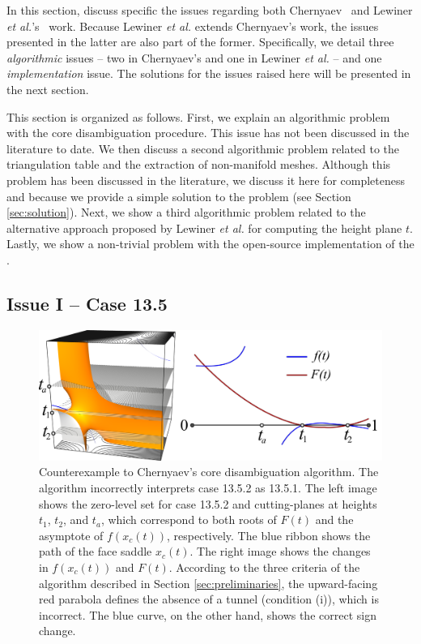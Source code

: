 In this section, discuss specific the issues regarding both Chernyaev~\cite{Chernyaev95marchingcubes} and Lewiner \emph{et al.}'s~\cite{Lewiner:2003} work. Because Lewiner \emph{et al.} extends Chernyaev's work, the issues presented in the latter are also part of the former. Specifically, we detail three \emph{algorithmic} issues -- two in Chernyaev's \mc{} and one in Lewiner \emph{et al.}  --  and one \emph{implementation} issue. The solutions for the issues raised here will be presented in the next section.

This section is organized as follows. First, we explain an algorithmic problem with the \mc{} core disambiguation procedure. This issue has not been discussed in the literature to date. We then discuss a second algorithmic problem related to the triangulation table and the extraction of non-manifold meshes. Although this problem has been discussed in the literature, we discuss it here for completeness and because we provide a simple solution to the problem (see Section \ref{sec:solution}). Next, we show a third algorithmic problem related to the alternative approach proposed by Lewiner \emph{et al.} for computing the height plane $t$. Lastly, we show a non-trivial problem with the open-source implementation of the \mc{}. 

\subsection{Issue I -- Case 13.5}
\label{sec:problem-case-13}

\begin{figure}
     \centering
     \includegraphics[width=1\linewidth]{chapter4/data/counter_example/graph.png}
     \caption{Counterexample to Chernyaev's core disambiguation algorithm. The \mc{} algorithm incorrectly interprets case 13.5.2 as 13.5.1. The left image shows the zero-level set for case 13.5.2 and cutting-planes at heights $t_1$, $t_2$, and $t_a$, which correspond to both roots of $F(t)$ and the asymptote of $f(x_c(t))$, respectively. The blue ribbon shows the path of the face saddle $x_c(t)$. The right image shows the changes in $f(x_c(t))$ and $F(t)$. According to the three criteria of the \mc{} algorithm described in Section \ref{sec:preliminaries},  the upward-facing red parabola defines the absence of a tunnel (condition (i)), which is incorrect. The blue curve, on the other hand, shows the correct sign change.}
     \label{fig:case13counter_example}
\end{figure}

